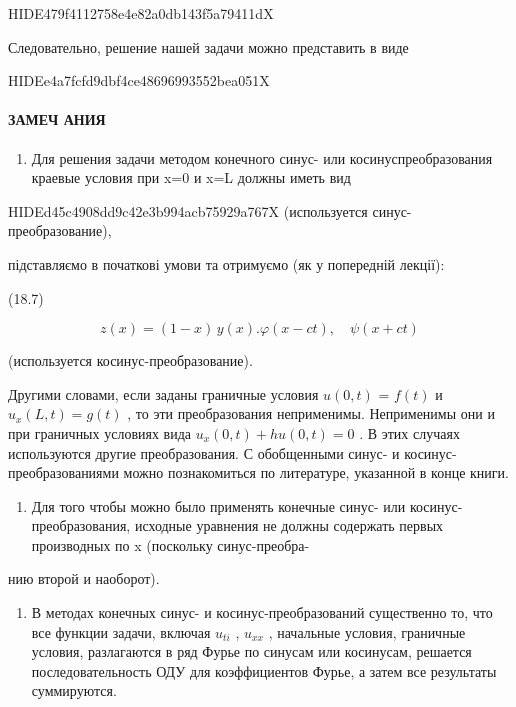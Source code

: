 \documentclass[
  ukrainian,
]{article}
\providecommand{\tightlist}{%
  \setlength{\itemsep}{0pt}\setlength{\parskip}{0pt}}
\begin{document}
HIDE479f4112758e4e82a0db143f5a79411dX

Следовательно, решение нашей задачи можно представить в виде

HIDEe4a7fcfd9dbf4ce48696993552bea051X

\paragraph{ЗАМЕЧ
АНИЯ}\label{ux437ux430ux43cux435ux447-ux430ux43dux438ux44f}

\begin{enumerate}
\def\labelenumi{\arabic{enumi}.}
\tightlist
\item
  Для решения задачи методом конечного синус- или косинуспреобразования
  краевые условия при x=0 и x=L должны иметь вид
\end{enumerate}

HIDEd45c4908dd9c42e3b994acb75929a767X (используется
синус-преобразование),

підставляємо в початкові умови та отримуємо (як у попередній лекції):

(18.7)

\[
z(x) = (1 - x)\, y(x).
\varphi(x-ct), \quad \psi(x+ct)
\]

(используется косинус-преобразование).

Другими словами, если заданы граничные условия \(u(0, t)\) = \(f(t)\) и
\(u_x(L, t) = g(t)\) , то эти преобразования неприменимы. Неприменимы
они и при граничных условиях вида \(u_x(0, t) + hu(0, t) = 0\) . В этих
случаях используются другие преобразования. С обобщенными синус- и
косинус-преобразованиями можно познакомиться по литературе, указанной в
конце книги.

\begin{enumerate}
\def\labelenumi{\arabic{enumi}.}
\setcounter{enumi}{1}
\tightlist
\item
  Для того чтобы можно было применять конечные синус- или
  косинус-преобразования, исходные уравнения не должны содержать первых
  производных по x (поскольку синус-преобра-
\end{enumerate}

нию второй и наоборот).

\begin{enumerate}
\def\labelenumi{\arabic{enumi}.}
\setcounter{enumi}{2}
\tightlist
\item
  В методах конечных синус- и косинус-преобразований существенно то, что
  все функции задачи, включая \(u_{ti}\) , \(u_{xx}\) , начальные
  условия, граничные условия, разлагаются в ряд Фурье по синусам или
  косинусам, решается последовательность ОДУ для коэффициентов Фурье, а
  затем все результаты суммируются.
\end{enumerate}
\end{document}
